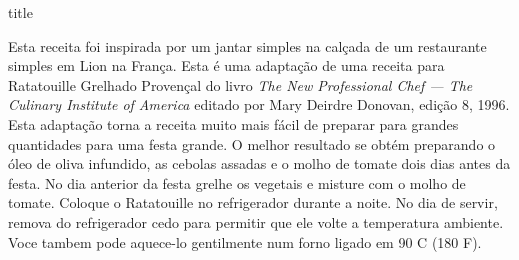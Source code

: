 \documentclass [11pt, letterpaper] {article}
\begin{document}
 {title}

Esta receita foi inspirada por um jantar simples na cal\c{c}ada de um restaurante simples em Lion na Fran\c{c}a.
Esta \'e uma adapta\c{c}\~ao de uma receita para Ratatouille Grelhado Proven\c{c}al do livro {\em The New Professional Chef --- The Culinary Institute of America} editado por Mary Deirdre Donovan, edi\c{c}\~ao 8, 1996. Esta adapta\c{c}\~ao torna a receita muito mais f\'acil de preparar para grandes quantidades para uma festa grande. O melhor resultado se obt\'em preparando o \'oleo de oliva infundido, as cebolas assadas e o molho de tomate dois dias antes da festa. No dia anterior da festa grelhe os vegetais e misture com o molho de tomate. Coloque o Ratatouille no refrigerador durante a noite. No dia de servir, remova do refrigerador cedo para permitir que ele volte a temperatura ambiente. Voce tambem pode aquece-lo gentilmente num forno ligado em 90 C (180 F).
\vspace{0.5in}
\end{document}
